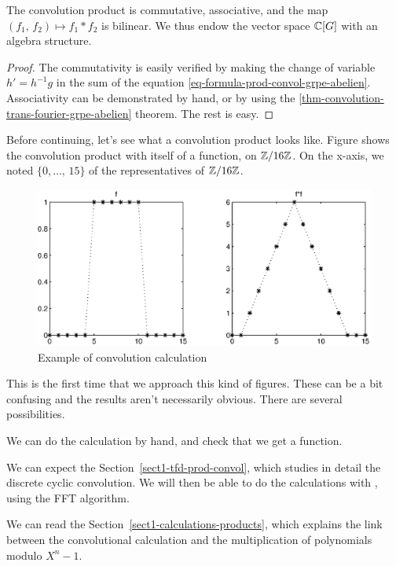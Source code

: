 \begin{prop}
The convolution product is commutative, associative, and the map $ (f_1, \, f_2) \mapsto f_1 * f_2 $ is bilinear. We thus endow the vector space $\mathbb{C}[G]$ with an algebra structure.
\end{prop}
\begin{proof}
The commutativity is easily verified by making the change of variable $ h'= h^{-1} g$ in the sum of the equation \eqref{eq-formula-prod-convol-grpe-abelien}. Associativity can be demonstrated by hand, or by using the \ref{thm-convolution-trans-fourier-grpe-abelien} theorem. The rest is easy.
\end{proof}
Before continuing, let's see  what a convolution product looks like. Figure  shows the convolution product with itself of a  function, on $\mathbb{Z}/16 \mathbb{Z}$. On the x-axis, we noted $\{0, \ldots, \, 15\}$ of the representatives of $\mathbb{Z}/16 \mathbb{Z}$. \begin{figure}[ht]
    \begin{center}
    \includegraphics[scale = 0.7]{images/convolution-intro.eps}
    \end{center}
    \caption{Example of convolution calculation}
\label{fig-convolution-intro}
\end{figure}
This is the first time that we approach this kind of figures. These can be a bit confusing and the results aren't necessarily obvious. There are several possibilities. \begin{rs}
\item We can do the calculation by hand, and check that we get a  function.
\item {} We can expect the Section~\ref{sect1-tfd-prod-convol}, which studies in detail the discrete cyclic convolution. We will then be able to do the calculations with \Matlab{}, using the FFT algorithm.
\item We can read the Section~\ref{sect1-calculations-products}, which explains the link between the convolutional calculation and the multiplication of polynomials modulo $ X^n-1$.
\end{rs}



